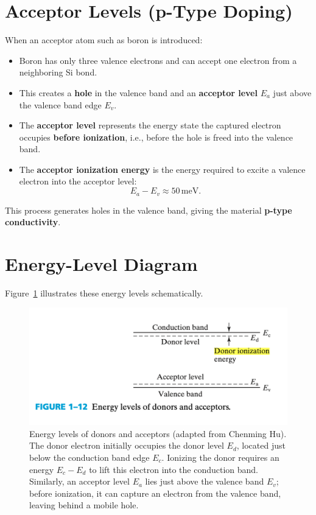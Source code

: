 \documentclass[12pt]{article}
\begin{document}
	\section{Acceptor Levels (p-Type Doping)}
	When an acceptor atom such as boron is introduced:
	\begin{itemize}
		\item Boron has only three valence electrons and can accept one electron from a neighboring Si bond.
		\item This creates a \textbf{hole} in the valence band and an \textbf{acceptor level} \(E_a\) just above the valence band edge \(E_v\).
		\item The \textbf{acceptor level} represents the energy state the captured electron occupies \textbf{before ionization}, i.e., before the hole is freed into the valence band.
		\item The \textbf{acceptor ionization energy} is the energy required to excite a valence electron into the acceptor level:
		\[
		E_a - E_v \approx 50\,\text{meV}.
		\]
	\end{itemize}
	This process generates holes in the valence band, giving the material \textbf{p-type conductivity}.
	
	\section{Energy-Level Diagram}
	Figure~\ref{fig:donor_acceptor} illustrates these energy levels schematically.
	
	\begin{figure}[h!]
		\centering
		\includegraphics[width=0.75\linewidth]{donor_acceptor_level.png}
		\caption{Energy levels of donors and acceptors (adapted from Chenming Hu). 
			The donor electron initially occupies the donor level \(E_d\), located just below the conduction band edge \(E_c\). 
			Ionizing the donor requires an energy \(E_c - E_d\) to lift this electron into the conduction band. 
			Similarly, an acceptor level \(E_a\) lies just above the valence band \(E_v\); before ionization, it can capture an electron from the valence band, leaving behind a mobile hole.}
		\label{fig:donor_acceptor}
	\end{figure}
	
\end{document}
